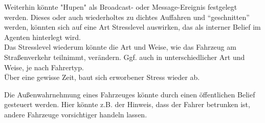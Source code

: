 Weiterhin könnte "Hupen" als Broadcast- oder Message-Ereignis festgelegt werden.
Dieses oder auch wiederholtes zu dichtes Auffahren und \enquote{geschnitten} werden, könnten sich auf eine Art Stresslevel auswirken, das als interner Belief im Agenten hinterlegt wird.
\\
Das Stresslevel wiederum könnte die Art und Weise, wie das Fahrzeug am Straßenverkehr teilnimmt, verändern. 
Ggf. auch in unterschiedlicher Art und Weise, je nach Fahrertyp.
\\
Über eine gewisse Zeit, baut sich erworbener Stress wieder ab.

Die Außenwahrnehmung eines Fahrzeuges könnte durch einen öffentlichen Belief gesteuert werden. 
Hier könnte z.B. der Hinweis, dass der Fahrer betrunken ist, andere Fahrzeuge vorsichtiger handeln lassen.